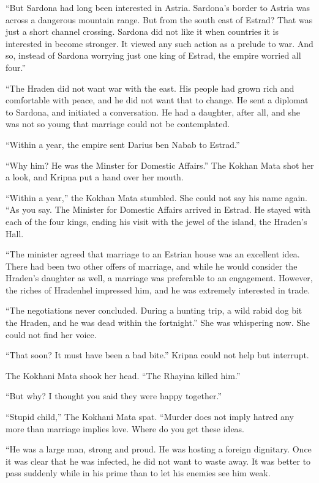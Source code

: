 \documentclass{article}
\begin{document}
	“But Sardona had long been interested in Astria. Sardona’s border to Astria was across a dangerous mountain range. But from the south east of Estrad? That was just a short channel crossing. Sardona did not like it when countries it is interested in become stronger. It viewed any such action as a prelude to war. And so, instead of Sardona worrying just one king of Estrad, the empire worried all four.”
	
	“The Hraden did not want war with the east. His people had grown rich and comfortable with peace, and he did not want that to change. He sent a diplomat to Sardona, and initiated a conversation. He had a daughter, after all, and she was not so young that marriage could not be contemplated.
	
	“Within a year, the empire sent Darius ben Nabab to Estrad.” 
	
	“Why him? He was the Minster for Domestic Affairs.” The Kokhan Mata shot her a look, and Kripna put a hand over her mouth. 
	
	“Within a year,” the Kokhan Mata stumbled. She could not say his name again. “As you say. The Minister for Domestic Affairs arrived in Estrad. He stayed with each of the four kings, ending his visit with the jewel of the island, the Hraden’s Hall.
	
	“The minister agreed that marriage to an Estrian house was an excellent idea. There had been two other offers of marriage, and while he would consider the Hraden’s daughter as well, a marriage was preferable to an engagement. However, the riches of Hradenhel impressed him, and he was extremely interested in trade.
	
	“The negotiations never concluded. During a hunting trip, a wild rabid dog bit the Hraden, and he was dead within the fortnight.” She was whispering now. She could not find her voice.
	
	“That soon? It must have been a bad bite.” Kripna could not help but interrupt.
	
	The Kokhani Mata shook her head. “The Rhayina killed him.” 
	
	“But why? I thought you said they were happy together.”
	
	“Stupid child,” The Kokhani Mata spat. “Murder does not imply hatred any more than marriage implies love. Where do you get these ideas. 
	
	“He was a  large man, strong and proud. He was hosting a foreign dignitary. Once it was clear that he was infected, he did not want to waste away. It was better to pass suddenly while in his prime than to let his enemies see him weak.
	
\end{document}
